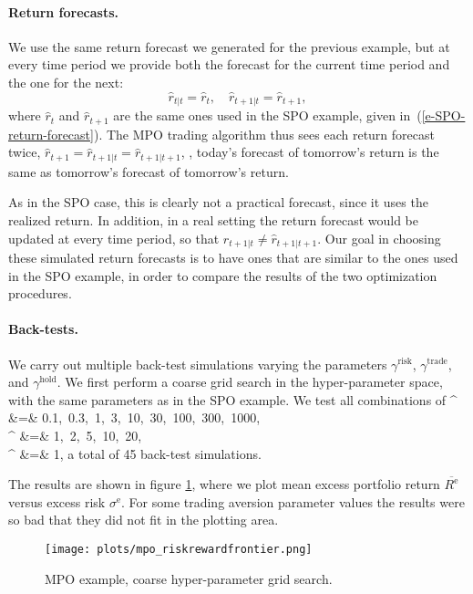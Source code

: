 \documentclass[openany]{article}  %
\newcommand{\Rep}{R^\mathrm{e}}
\begin{document}
\paragraph{Return forecasts.}
We use the same return forecast we generated for the previous example,
but at every time period we provide both the forecast for the current time period
and the one for the next:
\[
\hat r_{t|t} =  \hat r_t, \quad
\hat r_{t+1|t} =  \hat r_{t+1},
\]
where $\hat r_t$ and $\hat r_{t+1}$ are the same ones used in the
SPO example, given in~(\ref{e-SPO-return-forecast}).
The MPO trading algorithm thus sees each return forecast twice,
$\hat r_{t+1} = \hat r_{t+1|t} = \hat r_{t+1|t+1}$,
\ie, today's forecast of tomorrow's return is the same as tomorrow's forecast
of tomorrow's return.

As in the SPO case, this is clearly not a practical forecast, since it uses
the realized return.
In addition, in a real setting the return forecast would be updated at
every time period,
so that $\hat r_{t+1|t} \neq \hat r_{t+1|t+1}$.
Our goal in choosing these simulated return forecasts is to have ones that are
similar to the ones used in the SPO example, in order to compare the
results of the two optimization procedures.

\paragraph{Back-tests.}
We carry out multiple back-test simulations varying the parameters
$\gamma^\text{risk}$, $\gamma^\text{trade}$, and $\gamma^\text{hold}$.
We first perform a coarse grid search in the hyper-parameter space,
with the same parameters as in the SPO example.
We test all combinations of
\BEAS
\gamma^ &=& 0.1,~0.3,~1,~3,~10,~30,~100,~300,~1000,\\
\gamma^ &=& 1,~2,~5,~10,~20,\\
\gamma^ &=& 1,
\EEAS
a total of 45 back-test simulations.

The results are shown in figure \ref{fig:mpo-frontier},
where we plot mean excess portfolio return $\overline{\Rep}$
versus excess risk $\sigma^\mathrm{e}$.
For some trading aversion parameter values
the results were so bad that they did not fit in the plotting area.
\begin{figure}
\begin{center}
\texttt{[image: plots/mpo\_riskrewardfrontier.png]}
\end{center}
\caption{MPO example, coarse hyper-parameter grid search.}
\label{fig:mpo-frontier}
\end{figure}
\end{document}
